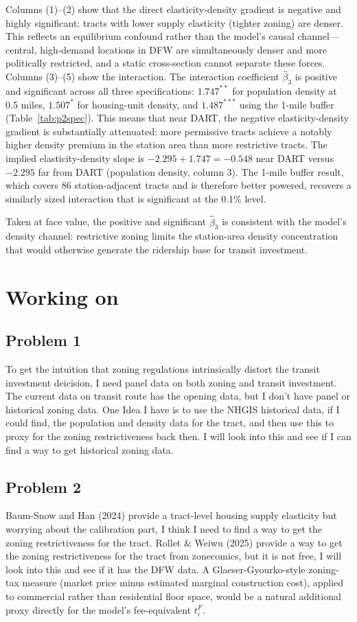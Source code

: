 \documentclass[12pt, a4paper]{article}
\theoremstyle{definition}
\begin{document}
Columns (1)--(2) show that the direct elasticity-density gradient is negative and highly significant: tracts with lower supply elasticity (tighter zoning) are denser. This reflects an equilibrium confound rather than the model's causal channel---central, high-demand locations in DFW are simultaneously denser and more politically restricted, and a static cross-section cannot separate these forces. Columns (3)--(5) show the interaction. The interaction coefficient $\hat\beta_3$ is positive and significant across all three specifications: $1.747^{**}$ for population density at 0.5 miles, $1.507^{*}$ for housing-unit density, and $1.487^{***}$ using the 1-mile buffer (Table~\ref{tab:p2spec}). This means that near DART, the negative elasticity-density gradient is substantially attenuated: more permissive tracts achieve a notably higher density premium in the station area than more restrictive tracts. The implied elasticity-density slope is $-2.295 + 1.747 = -0.548$ near DART versus $-2.295$ far from DART (population density, column 3). The 1-mile buffer result, which covers 86 station-adjacent tracts and is therefore better powered, recovers a similarly sized interaction that is significant at the 0.1\% level.

Taken at face value, the positive and significant $\hat\beta_3$ is consistent with the model's density channel: restrictive zoning limits the station-area density concentration that would otherwise generate the ridership base for transit investment.

\section{Working on}
\subsection{Problem 1}
To get the intuition that zoning regulations intrinsically distort the transit investment deicision, I need panel data on both zoning and transit investment. The current data on transit route has the opening data, but I don't have panel or historical zoning data. One Idea I have is to use the NHGIS historical data, if I could find, the population and density data for the tract, and then use this to proxy for the zoning restrictiveness back then. I will look into this and see if I can find a way to get historical zoning data. 
\subsection{Problem 2}
Baum-Snow and Han (2024) provide a tract-level housing supply elasticity but worrying about the calibration part, I think I need to find a way to get the zoning restrictiveness for the tract. Rollet \& Weiwu (2025) provide a way to get the zoning restrictiveness for the tract from zonecomics, but it is not free, I will look into this and see if it has the DFW data. A Glaeser-Gyourko-style zoning-tax measure (market price minus estimated marginal construction cost), applied to commercial rather than residential floor space, would be a natural additional proxy directly for the model's fee-equivalent $t_i^F$.
\printbibliography
\end{document}
